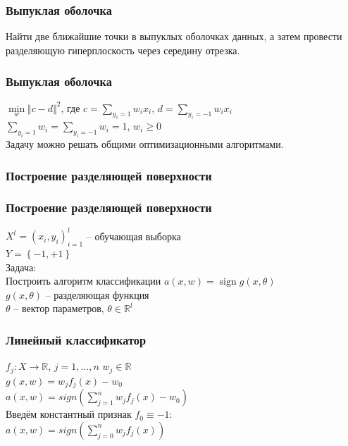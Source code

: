 \documentclass[12pt]{beamer}
\DeclareMathOperator{\sign}{sign}
\begin{document}
\begin{frame}\frametitle{Выпуклая оболочка}
Найти две ближайшие точки в выпуклых
оболочках данных, а затем провести разделяющую
гиперплоскость через середину отрезка.
\end{frame}

\begin{frame}\frametitle{Выпуклая оболочка}
$\min\limits_w \Vert c - d \Vert^2$, где $c = \sum\limits_{y_i = 1} w_ix_i$,  $d = \sum\limits_{y_i = -1} w_ix_i$\\
\vspace{5mm}
$\sum\limits_{y_i = 1}w_i = \sum\limits_{y_i = -1}w_i = 1$, $w_i \geq 0$\\
\vspace{5mm}
Задачу можно решать общими оптимизационными алгоритмами.
\end{frame}

\begin{frame}\frametitle{Построение разделяющей поверхности}
\end{frame}


\begin{frame}\frametitle{Построение разделяющей поверхности}
${X^l = (x_i,y_i)_{i = 1}^l}$ -- обучающая выборка\\ 
${Y=\left\{-1,+1\right\}}$\\
\vspace{5mm}
Задача:\\
Построить алгоритм классификации ${a(x,w) = \sign g(x,\theta)}$\\\vspace{5mm}
${g(x,\theta)}$ -- разделяющая функция\\
$\theta$ -- вектор параметров, $\theta \in \mathbb{R}^l$
\end{frame}


\begin{frame}\frametitle{Линейный классификатор}
$f_j: X \rightarrow \mathbb{R}$, $j = 1,\dots, n$ \hspace{5mm} $w_j \in \mathbb{R}$\\
$g(x, w) = w_jf_j(x) - w_0$\\
\vspace{5mm}
$a(x, w) = sign(\sum\limits_{j=1}^n w_jf_j(x) - w_0)$\\

\vspace{7mm}
Введём константный признак $f_0 \equiv -1$:\\
$a(x, w) = sign(\sum\limits_{j=0}^n w_jf_j(x))$\\
\end{frame}
\end{document}
